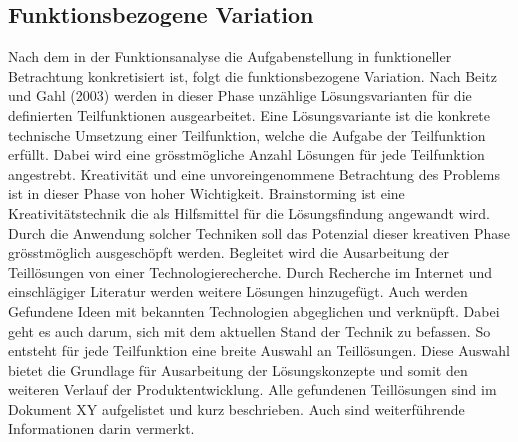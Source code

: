 \subsection{Funktionsbezogene Variation}
Nach dem in der Funktionsanalyse die Aufgabenstellung in funktioneller Betrachtung konkretisiert ist, folgt die funktionsbezogene Variation. Nach Beitz und Gahl (2003) werden in dieser Phase unzählige Lösungsvarianten für die definierten Teilfunktionen ausgearbeitet. Eine Lösungsvariante ist die konkrete technische Umsetzung einer Teilfunktion, welche die Aufgabe der Teilfunktion erfüllt. Dabei wird eine grösstmögliche Anzahl Lösungen für jede Teilfunktion angestrebt. 
\newline
Kreativität und eine unvoreingenommene Betrachtung des Problems ist in dieser Phase von hoher Wichtigkeit. Brainstorming ist eine Kreativitätstechnik die als Hilfsmittel für die Lösungsfindung angewandt wird. Durch die Anwendung solcher Techniken soll das Potenzial dieser kreativen Phase grösstmöglich ausgeschöpft werden.
\newline
Begleitet wird die Ausarbeitung der Teillösungen von einer Technologierecherche. Durch Recherche im Internet und einschlägiger Literatur werden weitere Lösungen hinzugefügt. Auch werden Gefundene Ideen mit bekannten Technologien abgeglichen und verknüpft. Dabei geht es auch darum, sich mit dem aktuellen Stand der Technik zu befassen. 
\newline
So entsteht für jede Teilfunktion eine breite Auswahl an Teillösungen. Diese Auswahl bietet die Grundlage für Ausarbeitung der Lösungskonzepte und somit den weiteren Verlauf der Produktentwicklung. Alle gefundenen Teillösungen sind im Dokument XY aufgelistet und kurz beschrieben. Auch sind weiterführende Informationen darin vermerkt.
